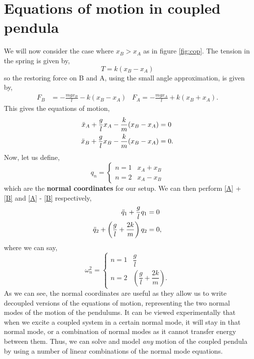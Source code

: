 \documentclass{book}
\begin{document}
\section{Equations of motion in coupled pendula}
\noindent We will now consider the case where $x_B > x_A$ as in figure \ref{fig:cop}. The tension in the spring is given by,
\begin{equation}
    T = k(x_B - x_A)
\end{equation}
so the restoring force on B and A, using the small angle approximation, is given by,
\begin{align}
    F_B & = -\frac{mgx_B}{l}-k(x_B - x_A) & F_A = -\frac{mgx_A}{l} + k(x_B + x_A).
\end{align}
This gives the equations of motion,
\begin{align}
    \Ddot{x}_A + \frac{g}{l}x_A - \frac{k}{m}(x_B - x_A) & = 0 \label{A} \\
    \Ddot{x}_B + \frac{g}{l}x_B - \frac{k}{m}(x_B - x_A) & = 0. \label{B}
\end{align}
Now, let us define,
\begin{equation}
    q_n = \begin{cases}
        n = 1 & x_A + x_B \\
        n = 2 & x_A - x_B
    \end{cases} \label{normalcooord}
\end{equation}
which are the \textbf{normal coordinates} for our setup.
We can then perform \eqref{A} + \eqref{B} and \eqref{A} - \eqref{B} respectively,
\begin{align}
    \Ddot{q}_1 + \frac{g}{l} q_1 & = 0 \\
    \Ddot{q}_2 + \left(\frac{g}{l} + \frac{2k}{m}\right)q_2 & = 0,
\end{align}
where we can say,
\begin{equation}
    \omega_n^2 = \begin{cases}
        n = 1 & \dfrac{g}{l} \\
        n = 2 & \left(\dfrac{g}{l} + \dfrac{2k}{m}\right).
    \end{cases}
\end{equation}
As we can see, the normal coordinates are useful as they allow us to write decoupled versions of the equations of motion, representing the two normal modes of the motion of the pendulums. It can be viewed experimentally that when we excite a coupled system in a certain normal  mode, it will stay in that normal mode, or a combination of normal modes as it cannot transfer energy between them. Thus, we can solve and model \textit{any} motion of the coupled pendula by using a number of linear combinations of the normal mode equations.
\end{document}

